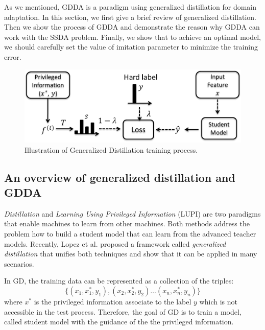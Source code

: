 As we mentioned, GDDA is a paradigm using generalized distillation for domain adaptation. In this section, we first give a brief review of generalized distillation. Then we show the process of GDDA and demonstrate the reason why GDDA can work with the SSDA problem. Finally, we show that to achieve an optimal model, we should carefully set the value of imitation parameter to minimize the training error. 
\begin{figure}
\centering
\includegraphics[scale=.4]{figure/GD.png}
\caption{Illustration of Generalized Distillation training process.}
\end{figure}
\subsection{An overview of generalized distillation and GDDA}
\textit{Distillation} \cite{hinton2015distilling} and \textit{Learning Using Privileged Information} (LUPI) \cite{vapnik2015learning} are two paradigms that enable machines to learn from other machines. Both methods address the problem how to build a student model that can learn from the advanced teacher models. Recently, Lopez {et al.} \cite{lopez2015unifying} proposed a framework called \textit{generalized distillation} that unifies both techniques and show that it can be applied in many scenarios.

In GD, the training data can be represented as a collection of the triples:
\[\{\left(x_1,x_1^*,y_1\right),\left(x_2,x_2^*,y_2\right) \dots \left(x_n,x_n^*,y_n\right)\}\]
where $x^*$ is the privileged information associate to the label $y$ which is not accessible in the test process. Therefore, the goal of GD is to train a model, called student model with the guidance of the the privileged information.

